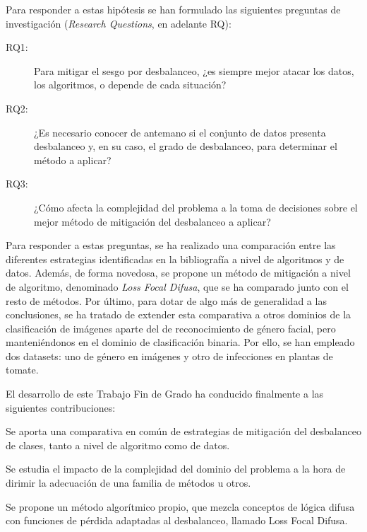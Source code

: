 Para responder a estas hipótesis se han formulado las siguientes preguntas de investigación (\textit{Research Questions}, en adelante RQ):

\begin{description}
    \item[RQ1:] Para mitigar el sesgo por desbalanceo, ¿es siempre mejor atacar los datos, los algoritmos, o depende de cada situación?
    
    \item[RQ2:] ¿Es necesario conocer de antemano si el conjunto de datos presenta desbalanceo y, en su caso, el grado de desbalanceo, para determinar el método a aplicar?
    
    \item[RQ3:] ¿Cómo afecta la complejidad del problema a la toma de decisiones sobre el mejor método de mitigación del desbalanceo a aplicar?
\end{description}

Para responder a estas preguntas, se ha realizado una comparación entre las diferentes estrategias identificadas en la bibliografía a nivel de algoritmos y de datos. Además, de forma novedosa, se propone un método de mitigación a nivel de algoritmo, denominado \textit{Loss Focal Difusa}, que se ha comparado junto con el resto de métodos. Por último, para dotar de algo más de generalidad a las conclusiones, se ha tratado de extender esta comparativa a otros dominios de la clasificación de imágenes aparte del de reconocimiento de género facial, pero manteniéndonos en el dominio de clasificación binaria. Por ello, se han empleado dos datasets: uno de género en imágenes y otro de infecciones en plantas de tomate.

El desarrollo de este Trabajo Fin de Grado ha conducido finalmente a las siguientes contribuciones:

\begin{description}
    \fontsize{11pt}{12pt}\selectfont
    \item[1:] Se aporta una comparativa en común de estrategias de mitigación del desbalanceo de clases, tanto a nivel de algoritmo como de datos.

    \item[2:] Se estudia el impacto de la complejidad del dominio del problema a la hora de dirimir la adecuación de una familia de métodos u otros.
    
    \item[3:] Se propone un método algorítmico propio, que mezcla conceptos de lógica difusa con funciones de pérdida adaptadas al desbalanceo, llamado Loss Focal Difusa.
\end{description}

